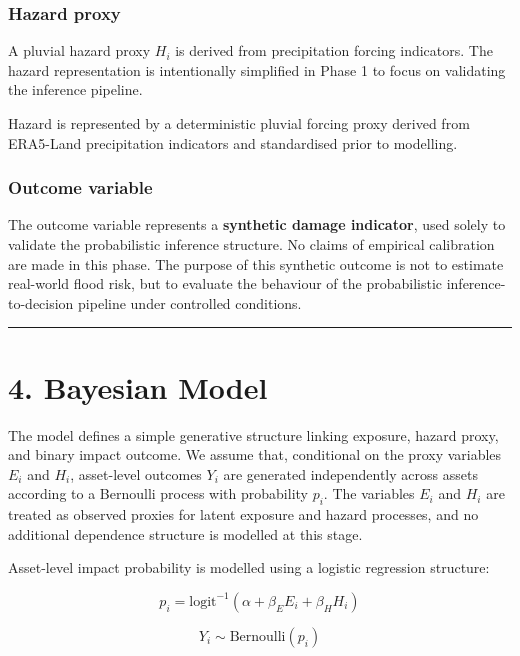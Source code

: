 \documentclass[
]{article}
\begin{document}
\subsubsection{Hazard proxy}\label{hazard-proxy}

A pluvial hazard proxy \(H_i\) is derived from precipitation forcing
indicators. The hazard representation is intentionally simplified in
Phase 1 to focus on validating the inference pipeline.

Hazard is represented by a deterministic pluvial forcing proxy derived
from ERA5-Land precipitation indicators and standardised prior to
modelling.

\subsubsection{Outcome variable}\label{outcome-variable}

The outcome variable represents a \textbf{synthetic damage indicator},
used solely to validate the probabilistic inference structure. No claims
of empirical calibration are made in this phase. The purpose of this
synthetic outcome is not to estimate real-world flood risk, but to
evaluate the behaviour of the probabilistic inference-to-decision
pipeline under controlled conditions.

\begin{center}\rule{0.5\linewidth}{0.5pt}\end{center}

\section{4. Bayesian Model}\label{bayesian-model}

The model defines a simple generative structure linking exposure, hazard
proxy, and binary impact outcome. We assume that, conditional on the
proxy variables \(E_i\) and \(H_i\), asset-level outcomes \(Y_i\) are
generated independently across assets according to a Bernoulli process
with probability \(p_i\). The variables \(E_i\) and \(H_i\) are treated
as observed proxies for latent exposure and hazard processes, and no
additional dependence structure is modelled at this stage.

Asset-level impact probability is modelled using a logistic regression
structure:

\[
p_i =
\text{logit}^{-1}
\left(
\alpha + \beta_E E_i + \beta_H H_i
\right)
\]

\[
Y_i \sim \text{Bernoulli}(p_i)
\]
\end{document}
